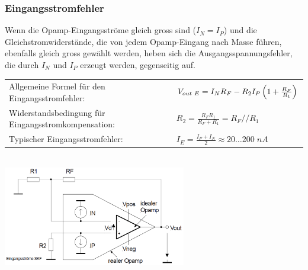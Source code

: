 		\subsubsection{Eingangsstromfehler}
			\begin{minipage}{18cm}
              Wenn die Opamp-Eingangsströme gleich gross sind
              ($I_{N}=I_{P}$) und die Gleichstromwiderstände,
              die von jedem Opamp-Eingang nach Masse führen, 
              ebenfalls gleich gross gewählt werden, heben sich die
              Ausgangsspannungsfehler, die durch $I_{N}$ und $I_{P}$
              erzeugt werden, gegenseitig auf. \\
              \begin{tabular}{ll}
              Allgemeine Formel für den
              Eingangsstromfehler: &
              $V_{out \hspace{1mm}E}=I_N R_F-R_2 I_P\left( 1+\frac{R_F}{R_1} \right)$\\
              Widerstandsbedingung für Eingangsstromkompensation:&
              $R_2=\frac{R_F R_1}{R_F+R_1}=R_F // R_1$\\
              Typischer Eingangsstromfehler: & $I_E=\frac{I_P+I_N}{2}\approx 20 \dots 200 \; nA$ \\
            	\end{tabular}
            \end{minipage}\\
			\includegraphics[width=8cm]{./images/eingangsstromfehler.png}

